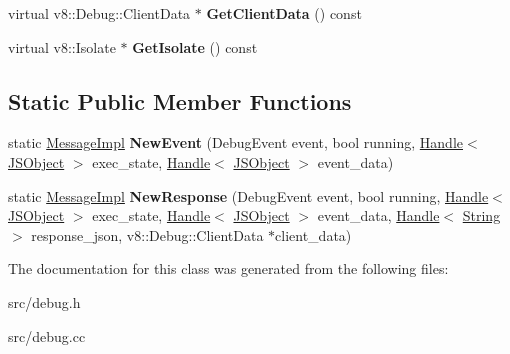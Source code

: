 \begin{DoxyCompactItemize}
\item 
\hypertarget{classv8_1_1internal_1_1_message_impl_a6ec7b5784c2c2fbc6159103a8904230a}{}virtual v8\+::\+Debug\+::\+Client\+Data $\ast$ {\bfseries Get\+Client\+Data} () const \label{classv8_1_1internal_1_1_message_impl_a6ec7b5784c2c2fbc6159103a8904230a}

\item 
\hypertarget{classv8_1_1internal_1_1_message_impl_afd44d25359cc8fcbb12a34c3f85cd8f1}{}virtual v8\+::\+Isolate $\ast$ {\bfseries Get\+Isolate} () const \label{classv8_1_1internal_1_1_message_impl_afd44d25359cc8fcbb12a34c3f85cd8f1}

\end{DoxyCompactItemize}
\subsection*{Static Public Member Functions}
\begin{DoxyCompactItemize}
\item 
\hypertarget{classv8_1_1internal_1_1_message_impl_aef580b1b84a58d691d48c9cc366df3df}{}static \hyperlink{classv8_1_1internal_1_1_message_impl}{Message\+Impl} {\bfseries New\+Event} (Debug\+Event event, bool running, \hyperlink{classv8_1_1internal_1_1_handle}{Handle}$<$ \hyperlink{classv8_1_1internal_1_1_j_s_object}{J\+S\+Object} $>$ exec\+\_\+state, \hyperlink{classv8_1_1internal_1_1_handle}{Handle}$<$ \hyperlink{classv8_1_1internal_1_1_j_s_object}{J\+S\+Object} $>$ event\+\_\+data)\label{classv8_1_1internal_1_1_message_impl_aef580b1b84a58d691d48c9cc366df3df}

\item 
\hypertarget{classv8_1_1internal_1_1_message_impl_a3be5a0658500e47124d319b5a2989e53}{}static \hyperlink{classv8_1_1internal_1_1_message_impl}{Message\+Impl} {\bfseries New\+Response} (Debug\+Event event, bool running, \hyperlink{classv8_1_1internal_1_1_handle}{Handle}$<$ \hyperlink{classv8_1_1internal_1_1_j_s_object}{J\+S\+Object} $>$ exec\+\_\+state, \hyperlink{classv8_1_1internal_1_1_handle}{Handle}$<$ \hyperlink{classv8_1_1internal_1_1_j_s_object}{J\+S\+Object} $>$ event\+\_\+data, \hyperlink{classv8_1_1internal_1_1_handle}{Handle}$<$ \hyperlink{classv8_1_1internal_1_1_string}{String} $>$ response\+\_\+json, v8\+::\+Debug\+::\+Client\+Data $\ast$client\+\_\+data)\label{classv8_1_1internal_1_1_message_impl_a3be5a0658500e47124d319b5a2989e53}

\end{DoxyCompactItemize}


The documentation for this class was generated from the following files\+:\begin{DoxyCompactItemize}
\item 
src/debug.\+h\item 
src/debug.\+cc\end{DoxyCompactItemize}
